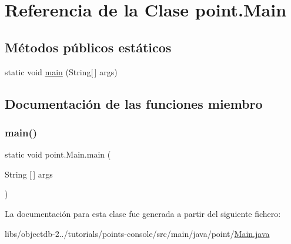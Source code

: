 \hypertarget{classpoint_1_1_main}{}\section{Referencia de la Clase point.\+Main}
\label{classpoint_1_1_main}
\subsection*{Métodos públicos estáticos}
\begin{DoxyCompactItemize}
\item 
static void \mbox{\hyperlink{classpoint_1_1_main_a736d1d9ee975829bd99678b72be48b71}{main}} (String\mbox{[}$\,$\mbox{]} args)
\end{DoxyCompactItemize}


\subsection{Documentación de las funciones miembro}
\mbox{\label{classpoint_1_1_main_a736d1d9ee975829bd99678b72be48b71}} 
\subsubsection{\texorpdfstring{main()}{main()}}
{\footnotesize\ttfamily static void point.\+Main.\+main (\begin{DoxyParamCaption}\item[{String \mbox{[}$\,$\mbox{]}}]{args }\end{DoxyParamCaption})\hspace{0.3cm}{\ttfamily [static]}}



La documentación para esta clase fue generada a partir del siguiente fichero\+:\begin{DoxyCompactItemize}
\item 
libs/objectdb-\/2../tutorials/points-\/console/src/main/java/point/\mbox{\hyperlink{_main_8java}{Main.\+java}}\end{DoxyCompactItemize}
